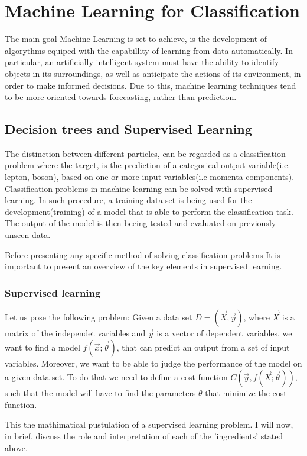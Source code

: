 \section{Machine Learning for Classification}
\label{sec:org837d169}
The main goal Machine Learning is set to achieve, is the development of algorythms equiped with the capabillity of learning from data automatically. In particular, an artificially intelligent system must have the ability to identify objects in its surroundings, as well as anticipate the actions of its environment, in order to make informed decisions. Due to this, machine learning techniques tend to be more oriented towards forecasting, rather than prediction.
\subsection{Decision trees and Supervised Learning}
\label{sec:org9e96dfd}
The distinction between different particles, can be regarded as a classification problem where the target, is the prediction of a categorical output variable(i.e. lepton, boson), based on one or more input variables(i.e momenta components). Classification problems in  machine learning can be solved with supervised learning. In such procedure, a training data set is being used for the development(training) of a model that is able to perform the classification task. The output of the model is then beeing tested and evaluated on previously unseen data.

Before presenting any specific method of solving classification problems It is important to present an overview of the key elements in supervised learning.

\subsubsection{Supervised learning}
\label{sec:orgc2bcda3}
Let us pose the following problem:
Given a data set \(D= (\vec{X}, \vec{y})\), where \(\vec{X}\) is a matrix of the independet variables and \(\vec{y}\) is a vector of dependent variables, we want to find a model \(f(\vec{x} ; \vec{\theta})\),  that can predict an output from a set of input variables. Moreover, we  want to be able to judge the performance of the model on a given data set. To do that we need to define a cost function \(C(\vec{y}, f(\vec{X}; \vec{\theta}))\), such that the model will have to find the parameters \(\theta\) that minimize the cost function.\cite{Mehta_2019}

This the mathimatical pustulation of a supervised learning problem. I will now, in brief, discuss the role and interpretation of each of the 'ingredients' stated above.

